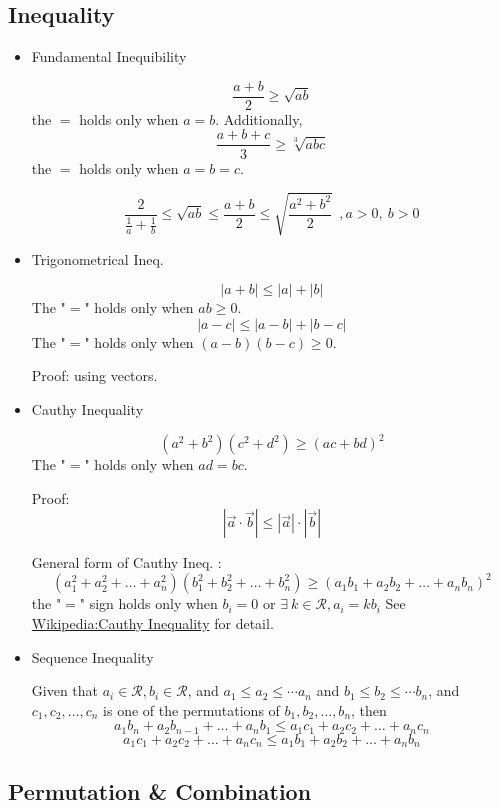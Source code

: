 \subsection{Inequality}

 \begin{itemize}

 \item{Fundamental Inequibility}

 \[ \frac{a+b}{2} \geqslant \sqrt{ab} \]
 the $=$ holds only when $a=b$. Additionally,
 \[ \frac{a+b+c}{3} \geqslant \sqrt[3]{abc} \]
 the $=$ holds only when $a=b=c$.

 \[ \frac{2}{\frac{1}{a}+\frac{1}{b}} \leqslant \sqrt{ab} \leqslant
    \frac{a+b}{2} \leqslant \sqrt{\frac{a^2+b^2}{2}} ~~,
		 a>0, ~b>0 \]

 \item{Trigonometrical Ineq.}

 \[ |a+b| \leqslant |a| + |b| \]
 The "$=$" holds only when $ab\geq0$.
 \[ |a-c| \leqslant |a-b| + |b-c| \]
 The "$=$" holds only when $(a-b)(b-c)\geq0$.

 Proof: using vectors.

 \item{Cauthy Inequality}

 \[ (a^2+b^2)(c^2+d^2) \geqslant (ac + bd)^2 \]
 The "$=$" holds only when $ad=bc$.

 Proof:
 \[ |\vec{a}\cdot\vec{b}| \leqslant |\vec{a}|\cdot|\vec{b}| \]

 General form of Cauthy Ineq. :
 \[ (a_1^2+a_2^2+\ldots+a_n^2)(b_1^2+b_2^2+\ldots+b_n^2) \geqslant (a_1b_1 + a_2b_2 +\ldots+ a_nb_n)^2 \]
 the "$=$" sign holds only when $b_i=0$ or $\exists~ k \in \mathcal{R}, a_i = kb_i$
 See \href{https://en.wikipedia.org/wiki/Cauchy-Schwarz_inequality}
 {Wikipedia:Cauthy Inequality} for detail.

 \item{Sequence Inequality}

 Given that $a_i \in \mathcal{R}, b_i \in \mathcal{R}$,
 and $a_1\leq a_2\leq \cdots a_n$ and $b_1\leq b_2\leq \cdots b_n$,
 and $c_1,c_2,\ldots,c_n$ is one of the permutations of $b_1,b_2,\ldots,b_n$, then
 \[ a_1b_n+a_2b_{n-1}+\ldots+a_nb_1 \leq a_1c_1 + a_2c_2 + \ldots + a_nc_n \]
 \[ a_1c_1 + a_2c_2 + \ldots + a_nc_n \leq a_1b_1 + a_2b_2 + \ldots + a_nb_n \]

 \end{itemize}

\subsection{Permutation \& Combination}

